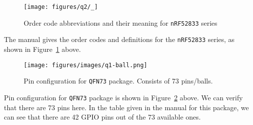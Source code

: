 \clearpage
\begin{figure}[htbp]
    \centering
    \texttt{[image: figures/q2/\_]}
    \vspace*{-3.5em}
    \caption{
        Order code abbreviations and their meaning for \texttt{nRF52833} series
    }\label{fig:q1-order}
\end{figure}

The manual gives the order codes and definitions for the \texttt{nRF52833} series, as shown in Figure~\ref{fig:q1-order} above.

\begin{figure}[htbp]
    \centering
    \texttt{[image: figures/images/q1-ball.png]}
    \caption{
        Pin configuration for \texttt{QFN73} package.
        Consists of 73 pins/balls.
    }\label{fig:q1-ball}
\end{figure}

Pin configuration for \texttt{QFN73} package is shown in Figure~\ref{fig:q1-ball} above.
We can verify that there are 73 pins here.
In the table given in the manual for this package, we can see that there are 42 GPIO pins out of the 73 available ones.

